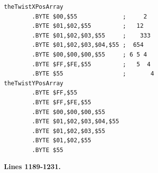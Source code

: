 \begin{lstlisting}[caption=Source code for the Twist]
theTwistXPosArray                        
        .BYTE $00,$55             ;     2  
        .BYTE $01,$02,$55         ;   12   
        .BYTE $01,$02,$03,$55     ;    333 
        .BYTE $01,$02,$03,$04,$55 ;  654   
        .BYTE $00,$00,$00,$55     ; 6 5 4  
        .BYTE $FF,$FE,$55         ;   5  4 
        .BYTE $55                 ;       4
theTwistYPosArray
        .BYTE $FF,$55
        .BYTE $FF,$FE,$55
        .BYTE $00,$00,$00,$55
        .BYTE $01,$02,$03,$04,$55
        .BYTE $01,$02,$03,$55
        .BYTE $01,$02,$55
        .BYTE $55
\end{lstlisting}




\clearpage
\textbf{Lines 1189-1231. } 
